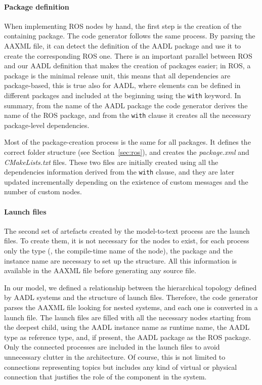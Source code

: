 \paragraph{Package definition} When implementing ROS nodes by hand, the first step is the creation of the containing package. The code generator follows the same process. By parsing the AAXML file, it can detect the definition of the AADL package and use it to create the corresponding ROS one. There is an important parallel between ROS and our AADL definition that makes the creation of packages easier; in ROS, a package is the minimal release unit, this means that all dependencies are package-based, this is true also for AADL, where elements can be defined in different packages and included at the beginning using the \texttt{with} keyword. In summary, from the name of the AADL package the code generator derives the name of the ROS package, and from the \texttt{with} clause it creates all the necessary package-level dependencies.

Most of the package-creation process is the same for all packages. It defines the correct folder structure (see Section~\ref{sec:ros}), and creates the \textit{package.xml} and \textit{CMakeLists.txt} files. These two files are initially created using all the dependencies information derived from the \texttt{with} clause, and they are later updated incrementally depending on the existence of custom messages and the number of custom nodes.

\paragraph{Launch files} The second set of artefacts created by the model-to-text process are the launch files. To create them, it is not necessary for the nodes to exist, for each process only the type (\ie, the compile-time name of the node), the package and the instance name are necessary to set up the structure. All this information is available in the AAXML file before generating any source file.

In our model, we defined a relationship between the hierarchical topology defined by AADL systems and the structure of launch files. Therefore, the code generator parses the AAXML file looking for nested systems, and each one is converted in a launch file.  The launch files are filled with all the necessary nodes starting from the deepest child, using the AADL instance name as runtime name, the AADL type as reference type, and, if present, the AADL package as the ROS package. Only the connected processes are included in the launch files to avoid unnecessary clutter in the architecture. Of course, this is not limited to connections representing topics but includes any kind of virtual or physical connection that justifies the role of the component in the system.

